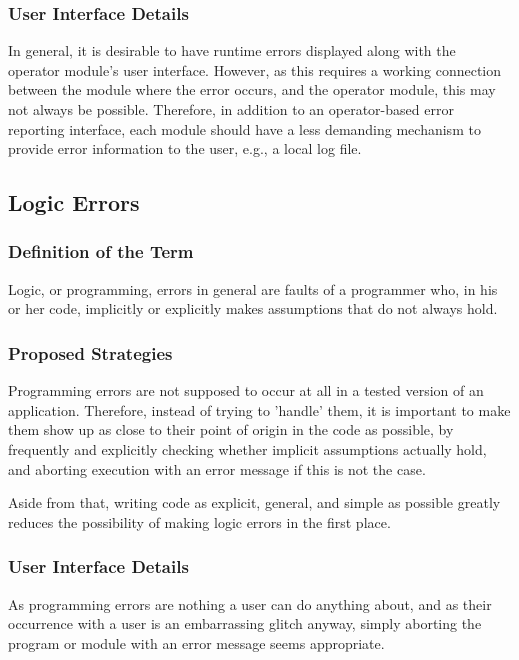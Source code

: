 \documentclass[12pt,a4paper]{article}
\begin{document}
\subsubsection{User Interface Details}

In general, it is desirable to have runtime errors displayed
along with the operator module's user interface. However,
as this requires a working connection between the module where
the error occurs, and the operator module, this may not
always be possible. Therefore, in addition to an
operator-based error reporting interface, each module should
have a less demanding mechanism to provide error information to the
user, e.g., a local log file.

\subsection{Logic Errors}

\subsubsection{Definition of the Term}

Logic, or programming, errors in general are faults of
a programmer who, in his or her code, implicitly or explicitly
makes assumptions that do not always hold.

\subsubsection{Proposed Strategies}

Programming errors are not supposed to occur at all in
a tested version of an application. Therefore, instead
of trying to 'handle' them, it is important to make them show
up as close to their point of origin in the code as
possible, by frequently and explicitly checking whether
implicit assumptions actually hold, and aborting execution
with an error message if this is not the case.

Aside from that, writing code as explicit, general, and
simple as possible greatly reduces the possibility of making
logic errors in the first place.

\subsubsection{User Interface Details}

As programming errors are nothing a user can do anything
about, and as their occurrence with a user is an embarrassing
glitch anyway, simply aborting the program or module with
an error message seems appropriate.
\end{document}
